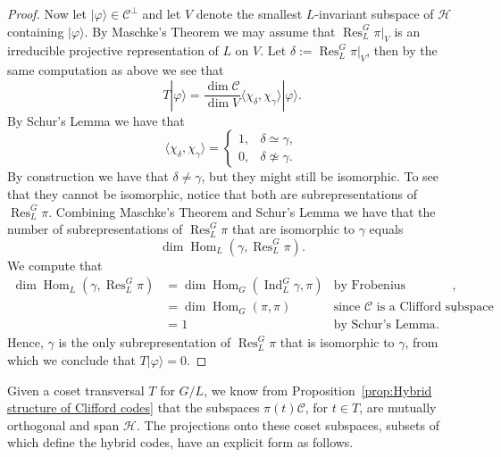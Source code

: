 \documentclass[11pt]{article}
\theoremstyle{definition}
\def\ket#1{| #1 \rangle}
\newcommand{\calC}{\mathcal{C}}
\newcommand{\calH}{\mathcal{H}}
\newcommand{\Ind}{\operatorname{Ind}}
\newcommand{\Res}{\operatorname{Res}}
\newcommand{\Hom}{\operatorname{Hom}}
\begin{document}
\begin{proof}
    Now let $\ket{\varphi} \in \calC^\perp$ and let $V$ denote the smallest $L$-invariant subspace of $\calH$ containing $\ket{\varphi}$. By Maschke's Theorem we may assume that $\Res^G_L\pi|_V$ is an irreducible projective representation of $L$ on $V$. Let $\delta := \Res^G_L\pi|_V$, then by the same computation as above we see that
    \begin{equation*}
        T \ket{\varphi} = \frac{\dim\calC}{\dim V}\langle\chi_\delta, \chi_\gamma\rangle\ket{\varphi}.
    \end{equation*}
    By Schur's Lemma we have that
    \begin{equation*}
        \langle\chi_\delta, \chi_\gamma\rangle =
        \begin{cases}
            1, & \delta \simeq \gamma, \\
            0, & \delta \not\simeq \gamma.
        \end{cases}
    \end{equation*}
    By construction we have that $\delta \neq \gamma$, but they might still be isomorphic. To see that they cannot be isomorphic, notice that both are subrepresentations of $\Res^G_L\pi$. Combining Maschke's Theorem and Schur's Lemma we have that the number of subrepresentations of $\Res^G_L\pi$ that are isomorphic to $\gamma$ equals
    \begin{equation*}
        \dim \Hom_L(\gamma, \Res^G_L\pi).
    \end{equation*}
    We compute that
    \begin{align*}
        \dim \Hom_L(\gamma, \Res^G_L\pi)
        & = \dim \Hom_G(\Ind_L^G\gamma, \pi) & \text{by Frobenius reciprocity}, \\
        & = \dim \Hom_G(\pi, \pi) & \text{since $\calC$ is a Clifford subspace code}, \\
        & = 1 & \text{by Schur's Lemma}.
    \end{align*}
    Hence, $\gamma$ is the only subrepresentation of $\Res^G_L\pi$ that is isomorphic to $\gamma$, from which we conclude that $T\ket{\varphi} = 0$.
\end{proof}

Given a coset transversal $T$ for $G / L$, we know from Proposition~\ref{prop:Hybrid structure of Clifford codes} that the subspaces $\pi(t)\mathcal C$, for $t\in T$, are mutually orthogonal and span $\mathcal H$. The projections onto these coset subspaces, subsets of which define the hybrid codes, have an explicit form as follows. 
\end{document}
